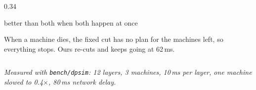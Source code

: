 \documentclass[aspectratio=169,11pt]{beamer}
\newcommand{\kefoot}[1]{%
  \vfill{\scriptsize\itshape\color{kemuted}#1}%
}
\newcommand{\kecard}[3][kemist]{%
  \begin{beamercolorbox}[wd=#2,sep=6pt,rounded=true]{}%
    \colorbox{#1}{\begin{minipage}{\dimexpr#2-14pt\relax}#3\end{minipage}}%
  \end{beamercolorbox}}
\begin{document}
\begin{frame}[shrink=20]
\begin{columns}[T]
\begin{column}{0.34\textwidth}
{\begin{minipage}{\dimexpr\textwidth-14pt\relax}
      \par
      {\scriptsize\color{white!62!keink}better than both when both happen at
       once}\vspace{0.2em}\end{minipage}}\vspace{0.35em}
    \kecard[keamber!12!white]{\textwidth}{{\scriptsize\color{keamber!60!black}
      When a machine dies, the fixed cut has no plan for the machines left,
      so everything stops. Ours re-cuts and keeps going at 62\,ms.}}
  \end{column}
  \end{columns}
  \kefoot{Measured with \texttt{bench/dpsim}: 12 layers, 3 machines,
          10\,ms per layer, one machine slowed to 0.4$\times$, 80\,ms network
          delay.}
\end{frame}
\end{document}
